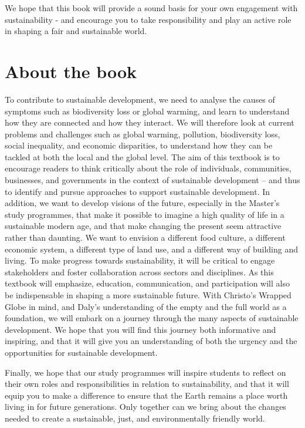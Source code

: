 \documentclass[
  a4paper,
  openany]{book}
\begin{document}
We hope that this book will provide a sound basis for your own
engagement with sustainability - and encourage you to take
responsibility and play an active role in shaping a fair and sustainable
world.

\section*{About the book}\label{about-the-book}


To contribute to sustainable development, we need to analyse the causes
of symptoms such as biodiversity loss or global warming, and learn to
understand how they are connected and how they interact. We will
therefore look at current problems and challenges such as global
warming, pollution, biodiversity loss, social inequality, and economic
disparities, to understand how they can be tackled at both the local and
the global level. The aim of this textbook is to encourage readers to
think critically about the role of individuals, communities, businesses,
and governments in the context of sustainable development -- and thus to
identify and pursue approaches to support sustainable development. In
addition, we want to develop visions of the future, especially in the
Master's study programmes, that make it possible to imagine a high
quality of life in a sustainable modern age, and that make changing the
present seem attractive rather than daunting. We want to envision a
different food culture, a different economic system, a different type of
land use, and a different way of building and living. To make progress
towards sustainability, it will be critical to engage stakeholders and
foster collaboration across sectors and disciplines. As this textbook
will emphasize, education, communication, and participation will also be
indispensable in shaping a more sustainable future. With Christo's
Wrapped Globe in mind, and Daly's understanding of the empty and the
full world as a foundation, we will embark on a journey through the many
aspects of sustainable development. We hope that you will find this
journey both informative and inspiring, and that it will give you an
understanding of both the urgency and the opportunities for sustainable
development.

Finally, we hope that our study programmes will inspire students to
reflect on their own roles and responsibilities in relation to
sustainability, and that it will equip you to make a difference to
ensure that the Earth remains a place worth living in for future
generations. Only together can we bring about the changes needed to
create a sustainable, just, and environmentally friendly world.
\end{document}
